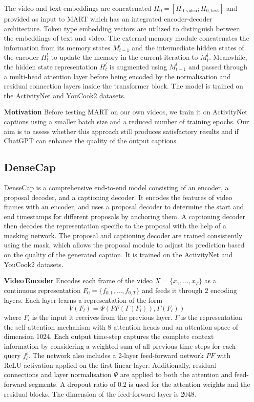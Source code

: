 The video and text embeddings are concatenated $H_0 = [H_{0, \text{video}}; H_{0, \text{text}}]$ and provided as input to MART which has an integrated encoder-decoder architecture. Token type embedding vectors are utilized to distinguish between the embeddings of text and video. The external memory module concatenates the information from its memory states $M^l_{t-1}$ and the intermediate hidden states of the encoder $H^l_{t}$ to update the memory in the current iteration to $M^l_{t}$. Meanwhile, the hidden state representation $H^l_{t}$ is augmented using $M^l_{t-1}$ and passed through a multi-head attention layer before being encoded by the normalisation and residual connection layers inside the transformer block. The model is trained on the ActivityNet and YouCook2 datasets.

\textbf{Motivation}
Before testing MART on our own videos, we train it on ActivityNet captions using a smaller batch size and a reduced number of training epochs. Our aim is to assess whether this approach still produces satisfactory results and if ChatGPT can enhance the quality of the output captions.

\subsection{DenseCap}
DenseCap \cite{johnson2016densecap} is a comprehensive end-to-end model consisting of an encoder, a proposal decoder, and a captioning decoder. It encodes the features of video frames with an encoder, and uses a proposal decoder to determine the start and end timestamps for different proposals by anchoring them. A captioning decoder then decodes the representation specific to the proposal with the help of a masking network. The proposal and captioning decoder are trained consistently using the mask, which allows the proposal module to adjust its prediction based on the quality of the generated caption. It is trained on the ActivityNet and YouCook2 datasets.

\textbf{Video\,Encoder} Encodes each frame of the video $X=\{x_1, \dots, x_T\}$ as a continuous representation $F_0=\{f_{0,1},...,f_{0,T}\}$ and feeds it through 2 encoding layers. Each layer learns a representation of the form 
\begin{equation}
 V(F_l) = \Psi(PF(\Gamma(F_l)),\Gamma(F_l)) 
\end{equation}
where $F_l$ is the input it receives from the previous layer. $\Gamma$ is the representation the self-attention mechanism with 8 attention heads and an attention space of dimension 1024. Each output time-step captures the complete context information by considering a weighted sum of all previous time steps for each query $f_l^t$. The network also includes a 2-layer feed-forward network $PF$ with ReLU activation applied on the first linear layer. Additionally, residual connections and layer normalisation $\Psi$ are applied to both the attention and feed-forward segments. A dropout ratio of 0.2 is used for the attention weights and the residual blocks. The dimension of the feed-forward layer is 2048.

